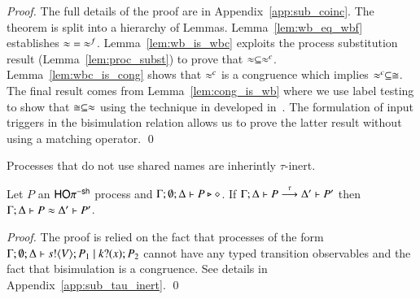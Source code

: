 \begin{proof}
	The full details of the proof are in Appendix~\ref{app:sub_coinc}.
	The theorem is split into a hierarchy of Lemmas. 
	Lemma~\ref{lem:wb_eq_wbf} establishes $\approx\ =\ \approx^{f}$.
	Lemma~\ref{lem:wb_is_wbc} exploits the process substitution result
	(Lemma~\ref{lem:proc_subst}) to prove that $\approx \subseteq \approx^{c}$.
	Lemma~\ref{lem:wbc_is_cong} shows that $\approx^{c}$ is a congruence
	which implies $\approx^{c} \subseteq \cong$.
	The final result comes from Lemma~\ref{lem:cong_is_wb} where
	we use label testing to show that $\cong \subseteq \approx$ using
	the technique in developed in~\cite{Hennessy07}. The formulation of input
	triggers in the bisimulation relation allows us to prove
	the latter result without using a matching operator.
	\qed
\end{proof}

%

Processes that do not use shared names are inherintly $\tau$-inert.

\begin{lemma}\rm
	\label{lem:tau_inert}
	Let $P$ an $\mathsf{HO}\pi^{\mathsf{-sh}}$ process
	and $\Gamma; \emptyset; \Delta \vdash P \triangleright \diamond$.
	If $\Gamma; \Delta \vdash P \stackrel{\tau}{\longrightarrow} \Delta' \vdash P'$ then $\Gamma; \Delta \vdash P \approx \Delta' \vdash P'$.
\end{lemma}

\begin{proof}
	The proof is relied on the fact that processes of the
	form $\Gamma; \emptyset; \Delta \vdash s ! \langle V \rangle ; P_1 \;|\; k ? (x) ; P_2$
	cannot have any typed transition observables and the fact
	that bisimulation is a congruence.
	See details in Appendix~\ref{app:sub_tau_inert}.
	\qed
\end{proof}

